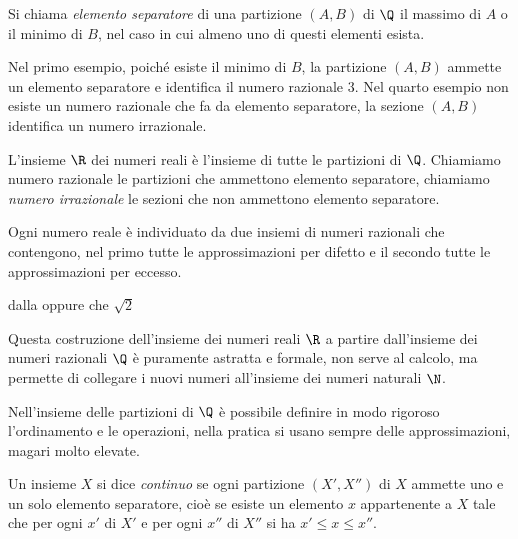 \begin{definizione}
Si chiama \emph{elemento separatore} di una partizione \((A,B)\) di \(\Q\) 
il 
massimo di \(A\) o il minimo di \(B\), nel caso in cui almeno uno di questi 
elementi 
esista.
\end{definizione}

Nel primo esempio, poiché esiste il minimo di \(B\), la partizione \((A,B)\) 
ammette 
un elemento separatore e identifica il numero razionale \(3\).
Nel quarto esempio non esiste un numero razionale che fa da elemento 
separatore, 
la sezione \((A,B)\) identifica un numero irrazionale.

\begin{definizione}
L'insieme \(\R\) dei numeri reali è l'insieme di tutte le partizioni di 
\(\Q\). Chiamiamo
numero razionale le partizioni che ammettono elemento separatore, chiamiamo 
\emph{numero irrazionale} le sezioni che non ammettono elemento separatore.
\end{definizione}

Ogni numero reale è individuato da due insiemi di numeri razionali che 
contengono, nel primo tutte le approssimazioni per difetto e il secondo
tutte le approssimazioni per eccesso.

dalla 
oppure 
che 
\(\sqrt{2}\) 

Questa costruzione dell'insieme dei numeri reali \(\R\) a partire 
dall'insieme dei numeri razionali \(\Q\) è puramente astratta e formale, 
non serve al calcolo, ma
permette di collegare i nuovi numeri all'insieme dei numeri naturali \(\N\). 

Nell'insieme delle partizioni di \(\Q\) è possibile definire in modo 
rigoroso 
l'ordinamento e le operazioni, nella pratica si usano sempre delle 
approssimazioni, magari molto elevate.

\begin{definizione}
Un insieme \(X\) si dice \emph{continuo} se ogni partizione \((X', X'')\) di 
\(X\) 
ammette uno e un solo elemento separatore, cioè se esiste un elemento \(x\) 
appartenente a \(X\) tale che per ogni \(x'\) di \(X'\) e per ogni \(x''\) di 
\(X''\) si 
ha \(x'{\leq}x{\leq}x''\).
\end{definizione}

